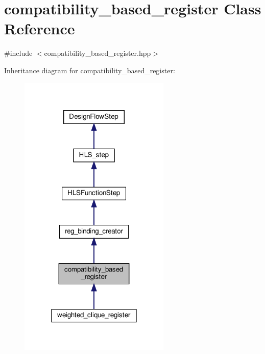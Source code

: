 \hypertarget{classcompatibility__based__register}{}\section{compatibility\+\_\+based\+\_\+register Class Reference}
\label{classcompatibility__based__register}


{\ttfamily \#include $<$compatibility\+\_\+based\+\_\+register.\+hpp$>$}



Inheritance diagram for compatibility\+\_\+based\+\_\+register\+:
\nopagebreak
\begin{figure}[H]
\begin{center}
\leavevmode
\includegraphics[width=204pt]{d5/d80/classcompatibility__based__register__inherit__graph}
\end{center}
\end{figure}


